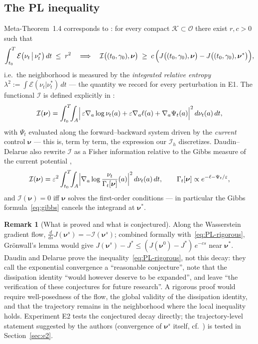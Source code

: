 \documentclass[11pt,leqno]{amsart}
\newcommand{\cI}{\mathcal{I}}
\newcommand{\cO}{\mathcal{O}}
\newcommand{\cE}{\mathcal{E}}
\newcommand{\bnu}{\boldsymbol{\nu}}
\newcommand{\eps}{\varepsilon}
\newcommand{\dd}{\,d}
\numberwithin{equation}{section}
\theoremstyle{definition}
\newtheorem{rmk}[thm]{Remark}
\begin{document}
\subsection{The PL inequality}
Meta-Theorem~1.4 corresponds to \cite[Theorem~5.1]{DaudinDelarue2025}: for
every compact $\mathcal K\subset\cO$ there exist $r,c>0$ such that
\begin{equation}
\label{eq:PL-rigorous}
\int_{t_0}^T\cE\bigl(\nu_t\,\big|\,\nu^*_t\bigr)\dd t\;\le\;r^2
\quad\Longrightarrow\quad
\cI\bigl((t_0,\gamma_0),\bnu\bigr)\;\ge\;
c\,\Bigl(J\bigl((t_0,\gamma_0),\bnu\bigr)-J\bigl((t_0,\gamma_0),\bnu^*\bigr)\Bigr),
\end{equation}
i.e.\ the neighborhood is measured by the \emph{integrated relative
entropy} $\lambda^2:=\int\cE(\nu_t|\nu^*_t)\dd t$ --- the quantity we
record for every perturbation in E1.  The functional $\cI$ is defined
explicitly in \cite[eq.~(5.1)]{DaudinDelarue2025}:
\begin{equation}
\label{eq:fisher}
\cI(\bnu)=\int_{t_0}^T\!\!\int_A
\Bigl|\,\eps\nabla_a\log\nu_t(a)+\eps\nabla_a\ell(a)+\nabla_a\Psi_t(a)\Bigr|^2
\dd\nu_t(a)\dd t ,
\end{equation}
with $\Psi_t$ evaluated along the forward--backward system driven by the
\emph{current} control $\bnu$ --- this is, term by term, the expression our
$\cI_h$ discretizes.  Daudin--Delarue also rewrite $\cI$ as a Fisher
information relative to the Gibbs measure of the current potential
\cite[eq.~(5.3)]{DaudinDelarue2025},
\begin{equation}
\label{eq:fisher-gamma}
\cI(\bnu)=\eps^2\int_{t_0}^T\!\!\int_A
\Bigl|\nabla_a\log\frac{\nu_t}{\Gamma_t[\bnu]}(a)\Bigr|^2\dd\nu_t(a)\dd t,
\qquad
\Gamma_t[\bnu]\propto e^{-\ell-\Psi_t/\eps},
\end{equation}
and $\cI(\bnu)=0$ iff $\bnu$ solves the first-order conditions --- in
particular the Gibbs formula~\eqref{eq:gibbs} cancels the integrand at
$\bnu^*$.

\begin{rmk}[What is proved and what is conjectured]
\label{rmk:conjecture}
Along the Wasserstein gradient flow, $\frac{d}{ds}J(\bnu^s)=-\cI(\bnu^s)$;
combined formally with~\eqref{eq:PL-rigorous}, Gr\"onwall's lemma would give
$J(\bnu^s)-J^*\le (J(\bnu^0)-J^*)\,e^{-c s}$ near $\bnu^*$.  Daudin and
Delarue prove the inequality~\eqref{eq:PL-rigorous}, not this decay: they
call the exponential convergence a ``reasonable conjecture'', note that the
dissipation identity ``would however deserve to be expanded'', and leave
``the verification of these conjectures for future research''.  A rigorous
proof would require well-posedness of the flow, the global validity of the
dissipation identity, and that the trajectory remains in the neighborhood
where the local inequality holds.  Experiment E2 tests the conjectured decay
directly; the trajectory-level statement suggested by the authors
(convergence of $\bnu^s$ itself, cf.~\cite{monmarche2024local}) is tested in
Section~\ref{sec:e2}.
\end{rmk}
\end{document}

